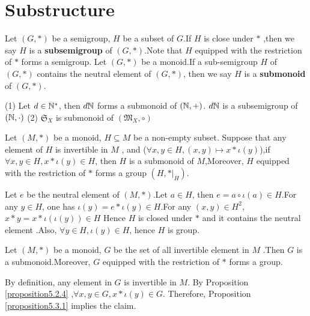 \documentclass{book}
\numberwithin{equation}{section}
\begin{document}
\section{Substructure}
\begin{definitionenv}
    Let $(G,*)$ be a semigroup, $H$ be a subset of $G$.If $H$ is close under $*$ ,then we say $H$ is a \textbf{subsemigroup} of $(G,*)$.Note that $H$ equipped with the restriction of $*$ forms a semigroup.
    Let $(G,*)$ be a monoid.If a sub-semigroup $H$ of $(G,*)$ contains the neutral element of $(G,*)$, then we say $H$ is a \textbf{submonoid} of $(G,*)$.
\end{definitionenv}
\begin{exampleenv}
   \quad
   \newline
   (1) Let $d\in \mathbb{N}^*$, then $d\mathbb{N}$ forms a submonoid of $(\mathbb{N},+)$.
   \newline
   $d\mathbb{N}$ is a subsemigroup of $(\mathbb{N},\cdot)$
    \newline
    (2) $\mathfrak{S} _X$ is submonoid of $(\mathfrak{M} _X,\circ)$
\end{exampleenv}
\begin{propositionenv}\label{proposition5.3.1}
    Let $(M,*)$ be a monoid, $H\subseteq M$ be a non-empty subset. Suppose that any element of $H$ is invertible in $M$ , and ($\forall x,y \in H,(x,y)\mapsto x*\iota(y)$),if $\forall x,y\in H, x*\iota(y)\in H$, then $H$ is a submonoid of $M$,Moreover, $H$ equipped with the restriction of $*$ forms a group $(H,*|_H)$. 
\end{propositionenv}
\begin{proofenv}
    Let $e$ be the neutral element of $(M,*)$.Let $a\in H$, then $e=a\circ\iota(a)\in H$.For any $y\in H$, one has $\iota(y)=e*\iota(y)\in H$.For any $(x,y)\in H^2$,$x*y=x*\iota(\iota(y))\in H$ Hence $H$ is closed under $*$ and it contains the neutral element .Also, $\forall y\in H, \iota(y)\in H$, hence $H$ is group. 
\end{proofenv}
\begin{corollaryenv}
    Let $(M,*)$ be a monoid, $G$ be the set of all invertible element in $M$ .Then $G$ is a submonoid.Moreover, $G$ equipped with the restriction of $*$ forms a group.
\end{corollaryenv}
\begin{proofenv}
    By definition, any element in $G$ is invertible in $M$. By Proposition \ref{proposition5.2.4} ,$\forall x,y\in G, x*\iota(y)\in G$. Therefore, Proposition \ref{proposition5.3.1} implies the claim.
\end{proofenv}
\end{document}
